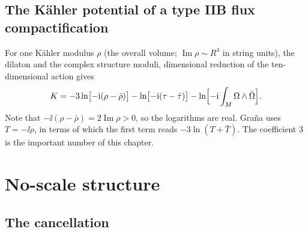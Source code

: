 \subsection{The K\"ahler potential of a type IIB flux compactification}

For one K\"ahler modulus $\rho$ (the overall volume; $\operatorname{Im}\rho\sim R^4$ in
string units), the dilaton and the complex structure moduli, dimensional reduction of the
ten-dimensional action gives 
\begin{equation}\label{eq:stabilization:Ktot}
 K=-3\ln\bigl[-\mathrm{i}(\rho-\bar\rho)\bigr]-\ln\bigl[-\mathrm{i}(\tau-\bar\tau)\bigr]
 -\ln\Bigl[-\mathrm{i}\int_M\Omega\wedge\bar\Omega\Bigr].
\end{equation}
Note that $-\ii(\rho-\bar\rho)=2\operatorname{Im}\rho>0$, so the logarithms are real. Gra\~na
uses $T=-\ii\rho$, in terms of which the first term reads $-3\ln(T+\bar T)$.
 The coefficient $3$ is the important number of
this chapter.

\section{No-scale structure}\label{sec:stabilization:noscale}

\subsection{The cancellation}

